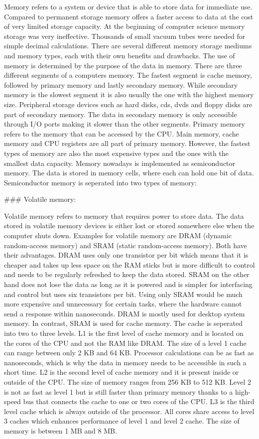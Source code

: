 Memory refers to a system or device that is able to store data for immediate use. Compared to permanent 
storage memory offers a faster access to data at the cost of very limited storage capacity. At the 
beginning of computer science memory storage was very ineffective. Thousands of small vacuum tubes 
were needed for simple decimal calculations. There are several different memory storage mediums and memory 
types, each with their own benefits and drawbacks. The use of memory is determined by the purpose of
the data in memory. There are three different segments of a computers memory. The fastest segment is cache
memory, followed by primary memory and lastly secondary memory. While secondary memory is the slowest segment it is
also usually the one with the highest memory size. Peripheral storage devices such as hard disks, cds, dvds and floppy disks
are part of secondary memory. The data in secondary memory is only accessible through I/O ports making 
it slower than the other segments. Primary memory refers to the memory that can be accessed by the CPU. Main memory, 
cache memory and CPU registers are all part of primary memory. However, the fastest types of memory 
are also the most expensive types and the ones with the smallest data capacity. Memory nowadays is 
implemented as semiconductor memory. The data is stored in memory cells, where each can hold one bit 
of data. Semiconductor memory is seperated into two types of memory:

### Volatile memory:

Volatile memory refers to memory that requires power to store data. The data stored in volatile memory
devices is either lost or stored somewhere else when the computer shuts down. Examples for volatile 
memory are DRAM (dynamic random-access memory) and SRAM (static random-access memory). Both have their
advantages. DRAM uses only one transistor per bit which means that it is cheaper and takes up less 
space on the RAM sticks but is more difficult to control and needs to be regularly refreshed to keep
the data stored. SRAM on the other hand does not lose the data as long as it is powered and is simpler for interfacing
and control but uses six transistors per bit. Using only SRAM would be much more expensive and unnecessary for 
certain tasks, where the hardware cannot send a response within nanoseconds. DRAM is mostly used for desktop system memory. 
In contrast, SRAM is used for cache memory. The cache is seperated into two to three levels. 
L1 is the first level of cache memory and is located on the cores of the CPU and not the RAM like DRAM. The 
size of a level 1 cache can range between only 2 KB and 64 KB. Processor calculations can be as fast as nanoseconds, which
is why the data in memory needs to be accessible in such a short time. L2 is the second level of cache memory
and it is present inside or outside of the CPU. The size of memory ranges from 256 KB to 512 KB.
Level 2 is not as fast as level 1 but is still faster than primary memory thanks to a high-speed bus
that connects the cache to one or two cores of the CPU. L3 is the third level cache which is always outside
of the processor. All cores share access to level 3 caches which enhances performance of level 1 and
level 2 cache. The size of memory is between 1 MB and 8 MB.

